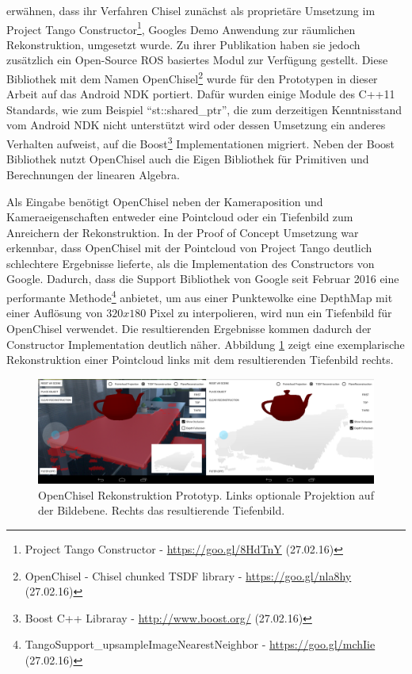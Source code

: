 \citet{Klingensmith_2015_7924} erwähnen, dass ihr Verfahren Chisel zunächst als proprietäre Umsetzung im Project Tango Constructor\footnote{Project Tango Constructor - \url{https://goo.gl/8HdTnY} (27.02.16)}, Googles Demo Anwendung zur räumlichen Rekonstruktion, umgesetzt wurde. Zu ihrer Publikation haben sie jedoch zusätzlich ein Open-Source ROS basiertes Modul zur Verfügung gestellt. Diese Bibliothek mit dem Namen OpenChisel\footnote{OpenChisel - Chisel chunked TSDF library - \url{https://goo.gl/nla8hy} (27.02.16)} wurde für den Prototypen in dieser Arbeit auf das Android NDK portiert. Dafür wurden einige Module des C++11 Standards, wie zum Beispiel \enquote{st::shared\_ptr}, die zum derzeitigen Kenntnisstand vom Android NDK nicht unterstützt wird oder dessen Umsetzung ein anderes Verhalten aufweist, auf die Boost\footnote{Boost C++ Libraray - \url{http://www.boost.org/} (27.02.16)} Implementationen migriert. Neben der Boost Bibliothek nutzt OpenChisel auch die Eigen Bibliothek für Primitiven und Berechnungen der linearen Algebra.

Als Eingabe benötigt OpenChisel neben der Kameraposition und Kameraeigenschaften entweder eine Pointcloud oder ein Tiefenbild zum Anreichern der Rekonstruktion. In der Proof of Concept Umsetzung war erkennbar, dass OpenChisel mit der Pointcloud von Project Tango deutlich schlechtere Ergebnisse lieferte, als die Implementation des Constructors von Google. Dadurch, dass die Support Bibliothek von Google seit Februar 2016 eine performante Methode\footnote{TangoSupport\_upsampleImageNearestNeighbor - \url{https://goo.gl/mchIie} (27.02.16)} anbietet, um aus einer Punktewolke eine DepthMap mit einer Auflösung von \(320x180\) Pixel zu interpolieren, wird nun ein Tiefenbild für OpenChisel verwendet. Die resultierenden Ergebnisse kommen dadurch der Constructor Implementation deutlich näher. Abbildung \ref{fig:chisel-demo} zeigt eine exemplarische Rekonstruktion einer Pointcloud links mit dem resultierenden Tiefenbild rechts.

\begin{figure}[h]
  \centering
	\includegraphics[width=1.0\textwidth]{content/images/implementation/chisel-demo.png} 
  \caption{OpenChisel Rekonstruktion Prototyp. Links optionale Projektion auf der Bildebene. Rechts das resultierende Tiefenbild.}
  \label{fig:chisel-demo}
\end{figure}


